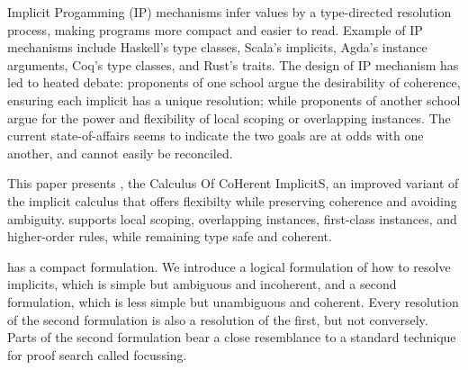 Implicit Progamming (IP) mechanisms infer values by a type-directed
resolution process, making programs more compact and easier to read.
Example of IP mechanisms include Haskell's type classes, Scala's
implicits, Agda's instance arguments, Coq's type classes, and Rust's
traits.  The design of IP mechanism has led to heated debate:
proponents of one school argue the desirability of coherence, ensuring
each implicit has a unique resolution; while proponents of another
school argue for the power and flexibility of local scoping or
overlapping instances.  The current state-of-affairs seems to indicate
the two goals are at odds with one another, and cannot easily be
reconciled.

This paper presents \name, the Calculus Of CoHerent ImplicitS,
an improved variant of the implicit calculus that offers flexibilty
while preserving coherence and avoiding ambiguity.  \name supports local scoping,
overlapping instances, first-class instances, and higher-order
rules, while remaining type safe and coherent.

\name has a compact formulation.
We introduce a logical formulation of how to resolve implicits, which
is simple but ambiguous and incoherent, and a second formulation,
which is less simple but unambiguous and coherent.  Every resolution
of the second formulation is also a resolution of the first, but not
conversely.  Parts of the second formulation bear a close resemblance
to a standard technique for proof search called focussing.






